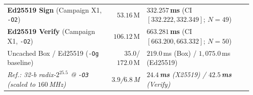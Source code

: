 \documentclass[conference]{IEEEtran}
\begin{document}
\begin{table}[t]
\begin{tabularx}{\columnwidth}{@{}>{\raggedright\arraybackslash}p{}r>{\raggedright\arraybackslash}X@{}}
\quad \textbf{Ed25519 Sign} (Campaign X1, \texttt{-O2}) & $53.16$\,M & $\mathbf{332.257}$\,\textbf{ms} (CI $[332.222,332.349]$; $N{=}49$) \\
\quad \textbf{Ed25519 Verify} (Campaign X1, \texttt{-O2}) & $106.12$\,M & $\mathbf{663.281}$\,\textbf{ms} (CI $[663.200,663.332]$; $N{=}50$) \\
\quad Uncached Box / Ed25519 (\texttt{-Og} baseline) & $35.0$/$172.0$\,M & $219.0$\,ms (Box) / $1{,}075.0$\,ms (Ed25519) \\
\quad \textit{Ref.: 32-b radix-$2^{25.5}$ @ \texttt{-O3} (scaled to $160$\,MHz)~\cite{oryx_esp32}} & \textit{$3.9$/$6.8$\,M} & \textit{$\mathbf{24.4}$\,\textbf{ms} (X25519) / $\mathbf{42.5}$\,\textbf{ms} (Verify)} \\
\bottomrule
\end{tabularx}
\end{table}
\end{document}
